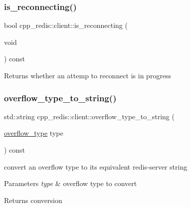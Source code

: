 \subsubsection{\texorpdfstring{is\+\_\+reconnecting()}{is\_reconnecting()}}
{\footnotesize\ttfamily bool cpp\+\_\+redis\+::client\+::is\+\_\+reconnecting (\begin{DoxyParamCaption}\item[{void}]{ }\end{DoxyParamCaption}) const}

\begin{DoxyReturn}{Returns}
whether an attemp to reconnect is in progress 
\end{DoxyReturn}
\mbox{\label{classcpp__redis_1_1client_a696a7fa2b06245323eca8c232d307585}} 
\subsubsection{\texorpdfstring{overflow\+\_\+type\+\_\+to\+\_\+string()}{overflow\_type\_to\_string()}}
{\footnotesize\ttfamily std\+::string cpp\+\_\+redis\+::client\+::overflow\+\_\+type\+\_\+to\+\_\+string (\begin{DoxyParamCaption}\item[{\hyperlink{classcpp__redis_1_1client_a4119182ad3a01c1bb626a174375e114a}{overflow\+\_\+type}}]{type }\end{DoxyParamCaption}) const}

convert an overflow type to its equivalent redis-\/server string


\begin{DoxyParams}{Parameters}
{\em type} & overflow type to convert \\
\hline
\end{DoxyParams}
\begin{DoxyReturn}{Returns}
conversion 
\end{DoxyReturn}
\mbox{\label{classcpp__redis_1_1client_a490ef812b666e6d845fcacc808b87bc1}} 
